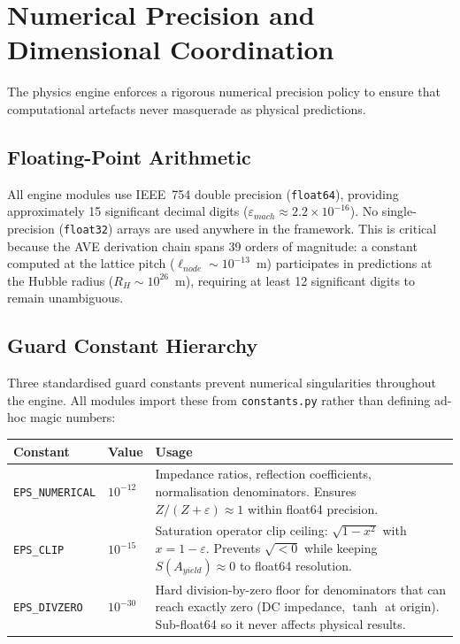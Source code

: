 \section{Numerical Precision and Dimensional Coordination}
\label{sec:precision_policy}

The physics engine enforces a rigorous numerical precision policy to ensure that computational artefacts never masquerade as physical predictions.

\subsection{Floating-Point Arithmetic}
All engine modules use IEEE~754 double precision (\texttt{float64}), providing approximately 15 significant decimal digits ($\varepsilon_{mach} \approx 2.2 \times 10^{-16}$).  No single-precision (\texttt{float32}) arrays are used anywhere in the framework.  This is critical because the AVE derivation chain spans 39 orders of magnitude: a constant computed at the lattice pitch ($\ell_{node} \sim 10^{-13}$~m) participates in predictions at the Hubble radius ($R_H \sim 10^{26}$~m), requiring at least 12 significant digits to remain unambiguous.

\subsection{Guard Constant Hierarchy}
Three standardised guard constants prevent numerical singularities throughout the engine.  All modules import these from \texttt{constants.py} rather than defining ad-hoc magic numbers:

\begin{center}
\small
\renewcommand{\arraystretch}{1.3}
\begin{tabular}{llp{7.2cm}}
\toprule
\textbf{Constant} & \textbf{Value} & \textbf{Usage} \\
\midrule
\texttt{EPS\_NUMERICAL} & $10^{-12}$ & Impedance ratios, reflection coefficients, normalisation denominators.  Ensures $Z/(Z + \varepsilon) \approx 1$ within float64 precision. \\
\texttt{EPS\_CLIP} & $10^{-15}$ & Saturation operator clip ceiling: $\sqrt{1 - x^2}$ with $x = 1 - \varepsilon$.  Prevents $\sqrt{<0}$ while keeping $S(A_{yield}) \approx 0$ to float64 resolution. \\
\texttt{EPS\_DIVZERO} & $10^{-30}$ & Hard division-by-zero floor for denominators that can reach exactly zero (DC impedance, $\tanh$ at origin).  Sub-float64 so it never affects physical results. \\
\bottomrule
\end{tabular}
\end{center}

